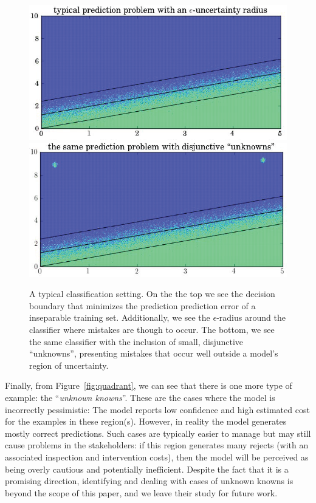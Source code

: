 \begin{figure}[t]

\begin{center}
\includegraphics[width=0.49\columnwidth]{plots/example_function_2a.png}
\includegraphics[width=0.49\columnwidth]{plots/example_function_2b.png}
\end{center}
\caption{A typical classification setting. On the the top we see the decision boundary that minimizes the prediction prediction error of a inseparable training set. Additionally, we see the $\epsilon$-radius around the classifier where mistakes are though to occur. The bottom, we see the same classifier with the inclusion of small, disjunctive ``unknowns'', presenting mistakes that occur well outside a model's region of uncertainty. }
\label{fig:unknown}
\end{figure}

Finally, from Figure~\ref{fig:quadrant}, we can see that there is one more type of example: the ``\emph{unknown knowns}''. These are the cases where the model is incorrectly pessimistic: The model reports low confidence and high estimated cost for the examples in these region(s). However, in reality the model generates mostly correct predictions. Such cases are typically easier to manage but may still cause problems in the stakeholders: if this region generates many rejects (with an associated inspection and intervention costs), then the model will be perceived as being overly cautious and potentially inefficient. Despite the fact that it is a promising direction, identifying and dealing with cases of unknown knowns is beyond the scope of this paper, and we leave their study for future work.
